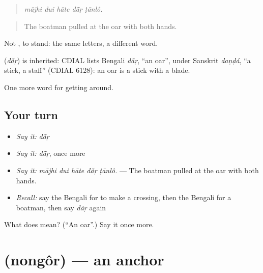 \begin{quote}
    
\end{quote}

\begin{quote}
\emph{mājhi dui hāte dā̃ṛ ṭānlô.}
\end{quote}

\begin{quote}
The boatman pulled at the oar with both hands.
\end{quote}

Not , to stand: the same letters, a different word.

\begin{cousinweb}
\textbf{} (\emph{dā̃ṛ}) is inherited: CDIAL lists Bengali \emph{dā̃ṛ}, \textquotedblleft{}an oar\textquotedblright{}, under Sanskrit \emph{daṇḍá}, \textquotedblleft{}a stick, a staff\textquotedblright{} (CDIAL 6128): an oar is a stick with a blade.
\end{cousinweb}

\begin{grammarlens}[title={What you've built}]
One more word for getting around.
\end{grammarlens}

\subsection*{Your turn}
\begin{itemize}
\raggedright
  \item \emph{Say it:} \emph{dā̃ṛ}
  \item \emph{Say it:} \emph{dā̃ṛ}, once more
  \item \emph{Say it:} \emph{mājhi dui hāte dā̃ṛ ṭānlô.} — The boatman pulled at the oar with both hands.
  \item \emph{Recall:} say the Bengali for to make a crossing, then the Bengali for a boatman, then say \emph{dā̃ṛ} again
\end{itemize}

\begin{tcolorbox}[breakable,colback=teal!4,colframe=teal!35!black,title={Before you move on}]
What does  mean? (\textquotedblleft{}An oar\textquotedblright{}.) Say it once more.
\end{tcolorbox}
\section[\texorpdfstring{\bn{নোঙর} (nongôr)}{নোঙর (nongôr)}]{ (nongôr) — an anchor}

